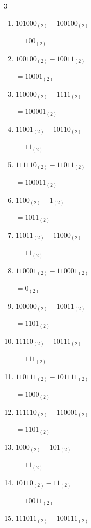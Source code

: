 \begin{multicols}{3}
\begin{enumerate}
  \item $101000_{(2)} - 100100_{(2)}$

        $=100_{(2)}$

  \item $100100_{(2)} - 10011_{(2)}$

        $=10001_{(2)}$

  \item $110000_{(2)} - 1111_{(2)}$

        $=100001_{(2)}$

  \item $11001_{(2)} - 10110_{(2)}$

        $=11_{(2)}$

  \item $111110_{(2)} - 11011_{(2)}$

        $=100011_{(2)}$

  \item $1100_{(2)} - 1_{(2)}$

        $=1011_{(2)}$

\columnbreak %

  \item $11011_{(2)} - 11000_{(2)}$

        $=11_{(2)}$

  \item $110001_{(2)} - 110001_{(2)}$

        $=0_{(2)}$

  \item $100000_{(2)} - 10011_{(2)}$

        $=1101_{(2)}$

  \item $11110_{(2)} - 10111_{(2)}$

        $=111_{(2)}$

  \item $110111_{(2)} - 101111_{(2)}$

        $=1000_{(2)}$

  \item $111110_{(2)} - 110001_{(2)}$

        $=1101_{(2)}$

  \item $1000_{(2)} - 101_{(2)}$

        $=11_{(2)}$

  \item $10110_{(2)} - 11_{(2)}$

        $=10011_{(2)}$

  \item $111011_{(2)} - 100111_{(2)}$


\end{enumerate}
\end{multicols}

